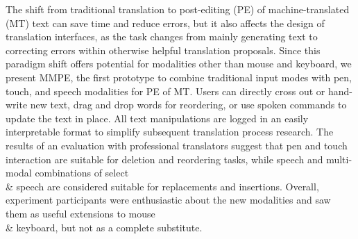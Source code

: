 The shift from traditional translation to post-editing (PE) of machine-translated (MT) text can save time and reduce errors, but it also affects the design of translation interfaces, as the task changes from mainly generating text to correcting errors within otherwise helpful translation proposals. Since this paradigm shift offers potential for modalities other than mouse and keyboard, we present MMPE, the first prototype to combine traditional input modes with pen, touch, and speech modalities for PE of MT. Users can directly cross out or hand-write new text, drag and drop words for reordering, or use spoken commands to update the text in place. All text manipulations are logged in an easily interpretable format to simplify subsequent translation process research. The results of an evaluation with professional translators suggest that pen and touch interaction are suitable for deletion and reordering tasks, while speech and multi-modal combinations of select \\& speech are considered suitable for replacements and insertions. Overall, experiment participants were enthusiastic about the new modalities and saw them as useful extensions to mouse \\& keyboard, but not as a complete substitute.
